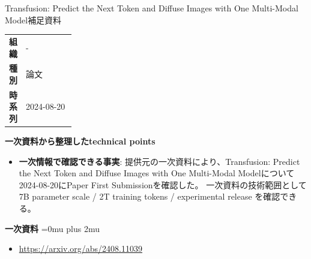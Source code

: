 \begin{technicalnote}{Transfusion: Predict the Next Token and Diffuse Images with One Multi-Modal Model}{補足資料}
\begingroup
\begin{tabularx}{\linewidth}{@{}>{\bfseries}p{0.22\linewidth}X@{}}
組織 & - \\
種別 & 論文 \\
時系列 & 2024-08-20 \\
\end{tabularx}
\smallskip
{\bfseries 一次資料から整理したtechnical points}
\begin{itemize}[leftmargin=1.5em,itemsep=0.35em]
\item \textbf{一次情報で確認できる事実}: 提供元の一次資料により、Transfusion: Predict the Next Token and Diffuse Images with One Multi-Modal Modelについて2024-08-20にPaper First Submissionを確認した。 一次資料の技術範囲として 7B parameter scale / 2T training tokens / experimental release を確認できる。
\end{itemize}
\begin{minipage}{\linewidth}
\begin{samepage}
{\bfseries 一次資料}
\begingroup\sloppy
\Urlmuskip=0mu plus 2mu\relax
\begin{itemize}[leftmargin=1.5em,itemsep=0.25em]
\item {\scriptsize\url{https://arxiv.org/abs/2408.11039}}
\end{itemize}
\endgroup
\end{samepage}
\end{minipage}
\endgroup
\end{technicalnote}
\medskip

